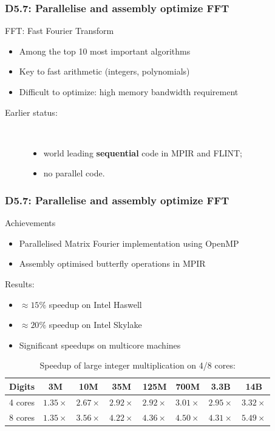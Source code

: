 \documentclass{beamer}
\begin{document}
\begin{frame}
  \frametitle{D5.7: Parallelise and assembly optimize FFT}

  \begin{block}    {FFT: Fast Fourier Transform}
    \begin{itemize}
    \item Among the top 10 most important algorithms
    \item Key to fast arithmetic (integers, polynomials)
    \item Difficult to optimize: high memory bandwidth requirement
    \end{itemize}
    \begin{description}
    \item[Earlier status:]\
      \begin{itemize}
      \item world leading \textbf{sequential} code in MPIR and FLINT;
      \item no parallel code.
        \end{itemize}
    \end{description}
  \end{block}
\end{frame}
\begin{frame}
  \frametitle{D5.7: Parallelise and assembly optimize FFT}
  \begin{block} {Achievements}
  \begin{itemize}
\item Parallelised Matrix Fourier implementation using OpenMP 
\item Assembly optimised butterfly operations in MPIR 
\end{itemize}
  \end{block}

\begin{block}{Results:}

\begin{itemize}
\item $\approx 15\%$ speedup  on Intel Haswell
\item $\approx 20\%$ speedup on Intel Skylake  
\item Significant speedups on multicore machines
\end{itemize}
\end{block}

\vspace{-1em}
\begin{table}
  \caption{Speedup of large integer multiplication on 4/8 cores:}
  \begin{tabular}{cccccccc}
  \toprule
{Digits} & 3M & 10M & 35M & 125M & 700M & 3.3B & 14B\\
\midrule
    {4 cores} & $1.35\times$ & $2.67\times$ & $2.92\times$ & $2.92\times$ & $3.01\times$ & $2.95\times$ & $3.32\times$ \\
{8 cores} & $1.35\times$ & $3.56\times$ & $4.22\times$ & $4.36\times$ & $4.50\times$ & $4.31\times$ & $5.49\times$\\
\bottomrule
\end{tabular}
\end{table}
\end{frame}
\end{document}
